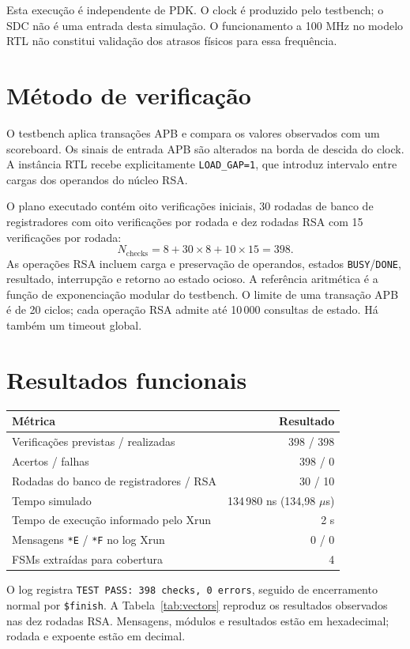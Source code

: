 \documentclass[11pt,a4paper]{article}
\begin{document}
Esta execução é independente de PDK. O clock é produzido pelo testbench;
o SDC não é uma entrada desta simulação. O funcionamento a 100 MHz no
modelo RTL não constitui validação dos atrasos físicos para essa frequência.

\section{Método de verificação}
O testbench aplica transações APB e compara os valores observados com um
scoreboard. Os sinais de entrada APB são alterados na borda de descida do
clock. A instância RTL recebe explicitamente \texttt{LOAD\_GAP=1}, que
introduz intervalo entre cargas dos operandos do núcleo RSA.

O plano executado contém oito verificações iniciais, 30 rodadas de banco
de registradores com oito verificações por rodada e dez rodadas RSA com
15 verificações por rodada:
\[
N_{\mathrm{checks}}=8+30\times8+10\times15=398.
\]
As operações RSA incluem carga e preservação de operandos, estados
\texttt{BUSY}/\texttt{DONE}, resultado, interrupção e retorno ao estado
ocioso. A referência aritmética é a função de exponenciação modular do
testbench. O limite de uma transação APB é de 20 ciclos; cada operação
RSA admite até 10\,000 consultas de estado. Há também um timeout global.

\section{Resultados funcionais}
\begin{center}
\begin{tabular}{@{}lr@{}}
\toprule
Métrica & Resultado \\
\midrule
Verificações previstas / realizadas & 398 / 398 \\
Acertos / falhas & 398 / 0 \\
Rodadas do banco de registradores / RSA & 30 / 10 \\
Tempo simulado & 134\,980 ns (134,98 $\mu$s) \\
Tempo de execução informado pelo Xrun & 2 s \\
Mensagens \texttt{*E} / \texttt{*F} no log Xrun & 0 / 0 \\
FSMs extraídas para cobertura & 4 \\
\bottomrule
\end{tabular}
\end{center}

O log registra \texttt{TEST PASS: 398 checks, 0 errors}, seguido de
encerramento normal por \texttt{\$finish}. A Tabela~\ref{tab:vectors}
reproduz os resultados observados nas dez rodadas RSA. Mensagens, módulos
e resultados estão em hexadecimal; rodada e expoente estão em decimal.
\end{document}
